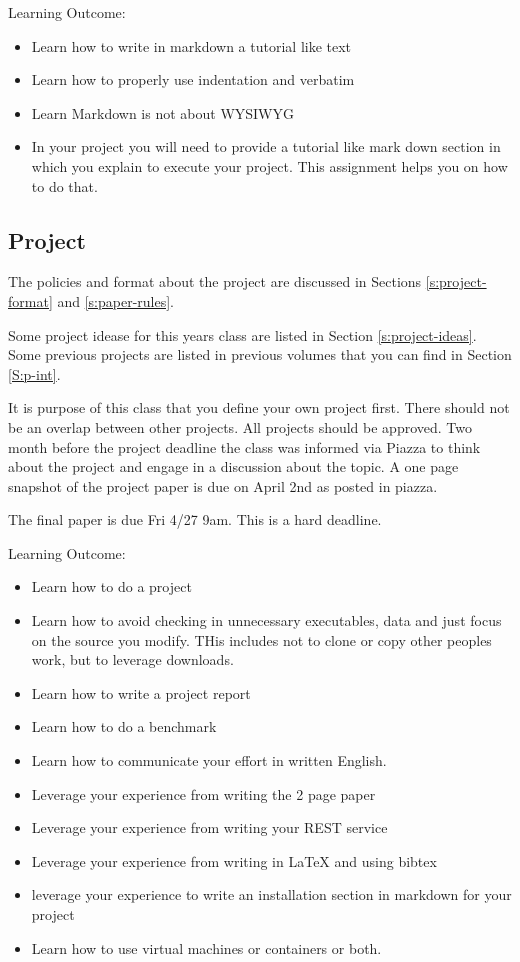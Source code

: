 Learning Outcome:
\begin{itemize}
\item Learn how to write in markdown a tutorial like text
\item Learn how to properly use indentation and verbatim 
\item Learn Markdown is not about WYSIWYG
\item In your project you will need to provide a tutorial like mark
  down section in which you explain to execute your project. This
  assignment helps you on how to do that.
\end{itemize}

\subsection{Project}
\label{E:project}

\begin{exercise} 

The policies and format about the project are discussed in Sections
\ref{s:project-format} and
\ref{s:paper-rules}.

Some project idease for this years class are listed in Section
\ref{s:project-ideas}. Some previous projects are listed in previous
volumes that you can find in Section \ref{S:p-int}.

It is purpose of this class that you define your own project
first. There should not be an overlap between other projects. All
projects should be approved.  Two month before the project deadline
the class was informed via Piazza to think about the project and
engage in a discussion about the topic. A one page snapshot of the
project paper is due on April 2nd as posted in piazza.

The final paper is due Fri 4/27 9am. This is a hard deadline.

\end{exercise} 


Learning Outcome:
\begin{itemize}
\item Learn how to do a project
\item Learn how to avoid checking in unnecessary executables, data and
  just focus on the source you modify. THis includes not to clone or
  copy other peoples work, but to leverage downloads.
\item Learn how to write a project report
\item Learn how to do a benchmark
\item Learn how to communicate your effort in written English.
\item Leverage your experience from writing the 2 page paper
\item Leverage your experience from writing your REST service
\item Leverage your experience from writing in LaTeX and using bibtex
\item leverage your experience to write an installation section in
  markdown for your project
\item Learn how to use virtual machines or containers or both.
\end{itemize}

